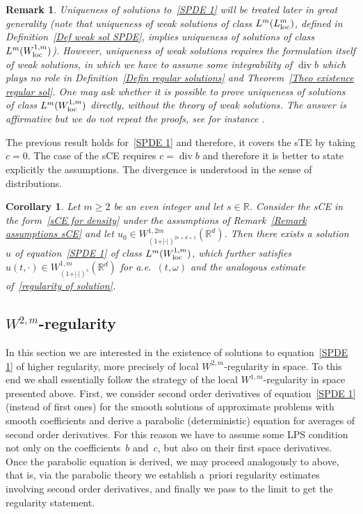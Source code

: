 \documentclass[a4paper,10pt]{article}
\newtheorem{corollary}[theorem]{Corollary}
\newtheorem{remark}[theorem]{Remark}
\newcommand\1{\mathbbm{1}}
\newcommand\loc{{\rm loc}}
\DeclareMathOperator{\diverg}{div}
\numberwithin{equation}{section}
\begin{document}
\begin{remark}
\label{Remark uniqueness regular}
Uniqueness of solutions to~\eqref{SPDE 1} will be treated later in great generality \textup{(}note that uniqueness of weak solutions of class $L^{m}(L^{m}_\loc)$, defined in Definition~\ref{Def weak sol SPDE}, implies uniqueness of solutions of class $L^m(W_{\loc}^{1,m})$\textup{)}. However, uniqueness of weak solutions requires the formulation itself of weak solutions, in which we have to assume some integrability of $\diverg b$ which plays no role in Definition~\ref{Defin regular solutions} and Theorem~\ref{Theo existence regular sol}. One may ask whether it is possible to prove uniqueness of solutions of class $L^m(W_{\loc}^{1,m})$ directly, without the theory of weak solutions. The answer is affirmative but we do not repeat the proofs, see for instance \textup{\cite[Appendix A]{FLAGUBPRI10}}. 
\end{remark}

The previous result holds for~\eqref{SPDE 1} and therefore, it covers the sTE by taking $c=0$. The case of the sCE requires $c=\diverg b$ and therefore it is better to state explicitly the assumptions. The divergence is understood in the sense of distributions.

\begin{corollary}
Let $m\geq2$ be an even integer and let $s\in\mathbb{R}$. Consider the sCE in the form~\eqref{sCE for density} under the assumptions of
Remark~\ref{Remark assumptions sCE} and let $u_{0}\in W_{(1+\vert \cdot\vert )^{2s+d+1}}^{1,2m}(\mathbb{R}^{d})$. Then there exists a solution~$u$ of equation~\eqref{SPDE 1} of class $L^m(W_{\loc}^{1,m})$, which further satisfies $u(t,\cdot)\in W_{(  1+\vert \cdot \vert )^{s}}^{1,m}(\mathbb{R}^{d})$ for a.e.~$(t,\omega)$
and the analogous estimate of~\eqref{regularity of solution}.
\end{corollary}

\subsection{$W^{2,m}$-regularity}\label{Section W^2}

In this section we are interested in the existence of solutions to equation~\eqref{SPDE 1} of higher regularity, more precisely of local $W^{2,m}$-regularity in space. To this end we shall essentially follow the strategy of the local $W^{1,m}$-regularity in space presented above. First, we consider second order derivatives of equation~\eqref{SPDE 1} (instead of first ones) for the smooth solutions of approximate problems with smooth coefficients and derive a parabolic (deterministic) equation for averages of second order derivatives. For this reason we have to assume some LPS condition not only on the coefficients~$b$ and~$c$, but also on their first space derivatives. Once the parabolic equation is derived, we may proceed analogously to above, that is, via the parabolic theory we establish a~priori regularity estimates involving second order derivatives, and finally we pass to the limit to get the regularity statement. 
\end{document}
